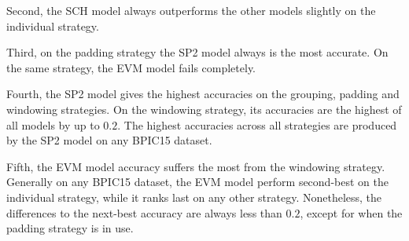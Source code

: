 Second, the SCH model always outperforms the other models slightly on the individual strategy.

Third, on the padding strategy the SP2 model always is the most accurate.
On the same strategy, the EVM model fails completely.

Fourth, the SP2 model gives the highest accuracies on the grouping, padding and windowing strategies.
On the windowing strategy, its accuracies are the highest of all models by up to $0.2$.
The highest accuracies across all strategies are produced by the SP2 model on any BPIC15 dataset.

Fifth, the EVM model accuracy suffers the most from the windowing strategy.
Generally on any BPIC15 dataset, the EVM model perform second-best on the individual strategy, while it ranks last on any other strategy.
Nonetheless, the differences to the next-best accuracy are always less than $0.2$, except for when the padding strategy is in use.

